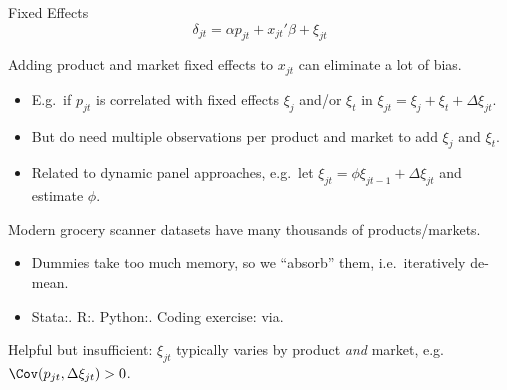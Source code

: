 \documentclass[aspectratio=169,t,11pt,table]{beamer}
\begin{document}
\begin{frame}{Fixed Effects}
    \vspace{-\baselineskip}
    \begin{equation*}
        \delta_{jt} = \alpha p_{jt} + x_{jt}'\beta + \xi_{jt}
    \end{equation*}
    \vspace{-0.5\baselineskip}
    \begin{wideitemize}
        \item Adding product and market fixed effects to $x_{jt}$ can eliminate a lot of bias.
        \begin{itemize}
            \item E.g.\ if $p_{jt}$ is correlated with fixed effects $\xi_j$ and/or $\xi_t$ in $\xi_{jt} = \xi_j + \xi_t + \Delta\xi_{jt}$.
            \item But do need multiple observations per product and market to add $\xi_j$ and $\xi_t$.
            \pause
            \item Related to dynamic panel approaches, e.g.\ let $\xi_{jt} = \phi \xi_{jt-1} + \Delta\xi_{jt}$ and estimate $\phi$.
        \end{itemize}
        \pause
        \item Modern grocery scanner datasets have many thousands of products/markets.
        \begin{itemize}
            \item Dummies take too much memory, so we ``absorb'' them, i.e.\ iteratively de-mean.
            \item Stata:. R:.  Python:. Coding exercise: via.
        \end{itemize}
        \pause
        \item Helpful but insufficient: $\xi_{jt}$ typically varies by product \textit{and} market, e.g.\ $\Cov(p_{jt}, \Delta\xi_{jt}) > 0$.
    \end{wideitemize}
\end{frame}
\end{document}
